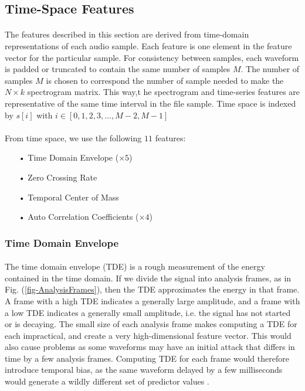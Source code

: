 \documentclass[12pt,letterpaper]{article}
\begin{document}

\subsection{Time-Space Features}
\label{subsec-TimeFeatures}

\paragraph*{}The features described in this section are derived from time-domain representations of each audio sample. Each feature is one element in the feature vector for the particular sample. For consistency between samples, each waveform is padded or truncated to contain the same number of samples $M$. The number of samples $M$ is chosen to correspond the number of sample needed to make the $N \times k$ spectrogram matrix. This way,t he spectrogram and time-series features are representative of the same time interval in the file sample. Time space is indexed by $s[i]$ with $i \in [0,1,2,3,...,M-2,M-1]$

\paragraph*{}From time space, we use the following $11$ features:
\begin{itemize}
\item[•] Time Domain Envelope ($\times 5$)
\item[•] Zero Crossing Rate
\item[•] Temporal Center of Mass
\item[•] Auto Correlation Coefficients ($\times 4$)
\end{itemize}


\newpage

\subsubsection{Time Domain Envelope}

\paragraph*{}The time domain envelope (TDE) is a rough measurement of the energy contained in the time domain. If we divide the signal into analysis frames, as in Fig. (\ref{fig-AnalysisFrames}), then the TDE approximates the energy in that frame. A frame with a high TDE indicates a generally large amplitude, and a frame with a low TDE indicates a generally small amplitude, i.e. the signal has not started or is decaying. The small size of each analysis frame makes computing a TDE for each impractical, and create a very high-dimensional feature vector. This would also cause problems as some waveforms may have an initial attack that differs in time by a few analysis frames. Computing TDE for each frame would therefore introduce temporal bias, as the same waveform delayed by a few milliseconds would generate a wildly different set of predictor values \cite{Serizel}. 
\end{document}
